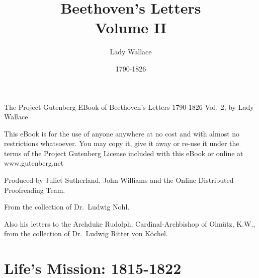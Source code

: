 \documentclass[12pt,oneside]{book}
\begin{document}
\frontmatter

The Project Gutenberg EBook of Beethoven's Letters 1790-1826 Vol.~2, by Lady Wallace \par 
\vspace{12pt}
This eBook is for the use of anyone anywhere at no cost and with almost no restrictions whatsoever.
You may copy it, give it away or re-use it under the terms of the Project Gutenberg License included with
this eBook or online at www.gutenberg.net \par 
\vspace{12pt}

Produced by Juliet Sutherland, John Williams and the Online Distributed Proofreading Team.
\pagebreak

\title{Beethoven's Letters\\Volume II}
\author{Lady Wallace}
\date{1790-1826}

\maketitle

From the collection of Dr.~Ludwig Nohl.\par 
\vspace{12pt}
Also his letters to the Archduke Rudolph, Cardinal-Archbishop of Olm\"utz, K.W., from the collection of Dr.~Ludwig Ritter von K\"ochel.

\pagebreak

\mainmatter

\setcounter{chapter}{1}

\chapter{Life's Mission: 1815-1822}

\setcounter{section}{215}
\end{document}
